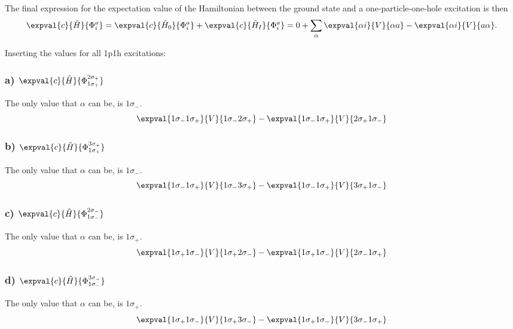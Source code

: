 The final expression for the expectation value of the Hamiltonian between the ground state and a one-particle-one-hole excitation is then
\begin{equation*}
    \expval{c}{\hat{H}}{\Phi_i^a} = \expval{c}{\hat{H}_0}{\Phi_i^a} + \expval{c}{\hat{H}_I}{\Phi_i^a} = 0 + \sum_{\alpha} \expval{\alpha i}{V}{\alpha a} - \expval{\alpha i}{V}{a \alpha}.
\end{equation*}

Inserting the values for all 1p1h excitations:

\subsubsection*{a) $\expval{c}{\hat{H}}{\Phi_{1\sigma_{+}}^{2\sigma_{+}}}$} %
The only value that $\alpha$ can be, is $1\sigma_{-}$.
\begin{equation*}
    \expval{1\sigma_{-} 1\sigma_{+}}{V}{1\sigma_{-} 2\sigma_{+}} - \expval{1\sigma_{-} 1\sigma_{+}}{V}{2\sigma_{+} 1\sigma_{-}}
\end{equation*}

\subsubsection*{b) $\expval{c}{\hat{H}}{\Phi_{1\sigma_{+}}^{3\sigma_{+}}}$} %
The only value that $\alpha$ can be, is $1\sigma_{-}$.
\begin{equation*}
    \expval{1\sigma_{-} 1\sigma_{+}}{V}{1\sigma_{-} 3\sigma_{+}} - \expval{1\sigma_{-} 1\sigma_{+}}{V}{3\sigma_{+} 1\sigma_{-}}
\end{equation*}

\subsubsection*{c) $\expval{c}{\hat{H}}{\Phi_{1\sigma_{-}}^{2\sigma_{-}}}$} %
The only value that $\alpha$ can be, is $1\sigma_{+}$.
\begin{equation*}
    \expval{1\sigma_{+} 1\sigma_{-}}{V}{1\sigma_{+} 2\sigma_{-}} - \expval{1\sigma_{+} 1\sigma_{-}}{V}{2\sigma_{-} 1\sigma_{+}}
\end{equation*}

\subsubsection*{d) $\expval{c}{\hat{H}}{\Phi_{1\sigma_{-}}^{3\sigma_{-}}}$} %
The only value that $\alpha$ can be, is $1\sigma_{+}$.
\begin{equation*}
    \expval{1\sigma_{+} 1\sigma_{-}}{V}{1\sigma_{+} 3\sigma_{-}} - \expval{1\sigma_{+} 1\sigma_{-}}{V}{3\sigma_{-} 1\sigma_{+}}
\end{equation*}

